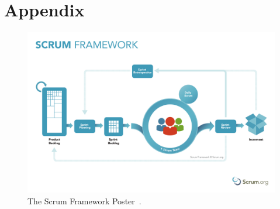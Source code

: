 \documentclass[12pt,a4paper]{article}
\theoremstyle{definition}
\begin{document}
\newpage

\section{Appendix}

    \begin{figure}[H]
        \centering
        \includegraphics[scale=0.4]{img/ScrumFramework.pdf}
        \caption{The Scrum Framework Poster~\cite{ScrumOrgPoster}.}
        \label{fig:ScrumOrgPoster}
    \end{figure}
\end{document}
